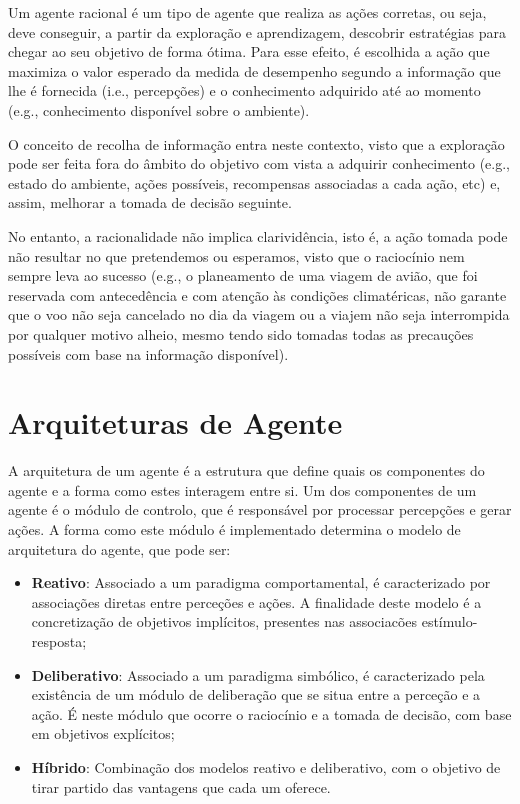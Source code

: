 Um agente racional é um tipo de agente que realiza as ações corretas, ou seja, deve conseguir, a partir da exploração e aprendizagem, descobrir estratégias para chegar ao seu objetivo de forma ótima.
Para esse efeito, é escolhida a ação que maximiza o valor esperado da medida de desempenho segundo a informação que lhe é fornecida (i.e., percepções) e o conhecimento adquirido até ao momento (e.g., conhecimento disponível sobre o ambiente).

O conceito de recolha de informação entra neste contexto, visto que a exploração pode ser feita fora do âmbito do objetivo com vista a adquirir conhecimento (e.g., estado do ambiente, ações possíveis, recompensas associadas a cada ação, etc) e, assim, melhorar a tomada de decisão seguinte.

No entanto, a racionalidade não implica clarividência, isto é, a ação tomada pode não resultar no que pretendemos ou esperamos, visto que o raciocínio nem sempre leva ao sucesso (e.g., o planeamento de uma viagem de avião, que foi reservada com antecedência e com atenção às condições climatéricas, não garante que o voo não seja cancelado no dia da viagem ou a viajem não seja interrompida por qualquer motivo alheio, mesmo tendo sido tomadas todas as precauções possíveis com base na informação disponível).


\section{Arquiteturas de Agente}\label{sec:arquiteturas-agente}

A arquitetura de um agente é a estrutura que define quais os componentes do agente e a forma como estes interagem entre si.
Um dos componentes de um agente é o módulo de controlo, que é responsável por processar percepções e gerar ações.
A forma como este módulo é implementado determina o modelo de arquitetura do agente, que pode ser:

\begin{itemize}
    \item \textbf{Reativo}: Associado a um paradigma comportamental, é caracterizado por associações diretas entre perceções e ações.
    A finalidade deste modelo é a concretização de objetivos implícitos, presentes nas associacões estímulo-resposta;
    \item \textbf{Deliberativo}: Associado a um paradigma simbólico, é caracterizado pela existência de um módulo de deliberação que se situa entre a perceção e a ação.
    É neste módulo que ocorre o raciocínio e a tomada de decisão, com base em objetivos explícitos;
    \item \textbf{Híbrido}: Combinação dos modelos reativo e deliberativo, com o objetivo de tirar partido das vantagens que cada um oferece.
\end{itemize}
